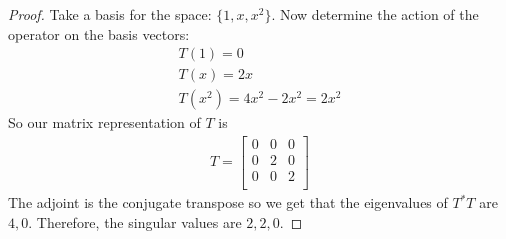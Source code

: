 \documentclass{article}
\begin{document}
\begin{proof}
	Take a basis for the space: $\{1, x, x^{2}\}$. Now determine the action of the operator on the basis vectors:
	\begin{gather*}
		T(1) = 0 \\
		T(x) = 2x \\
		T(x^{2}) = 4x^{2} - 2x^{2} = 2x^{2}
	\end{gather*}
	So our matrix representation of $T$ is 
	\begin{align*}
		T = 
		\begin{bmatrix}
		0 & 0 & 0 \\
		0 & 2 & 0 \\
		0 & 0 & 2 \\
		\end{bmatrix}
	\end{align*}
	The adjoint is the conjugate transpose so we get that the eigenvalues of $T^{*}T$ are $4, 0$. Therefore, the singular values are $2, 2, 0$.
\end{proof}
\end{document}

